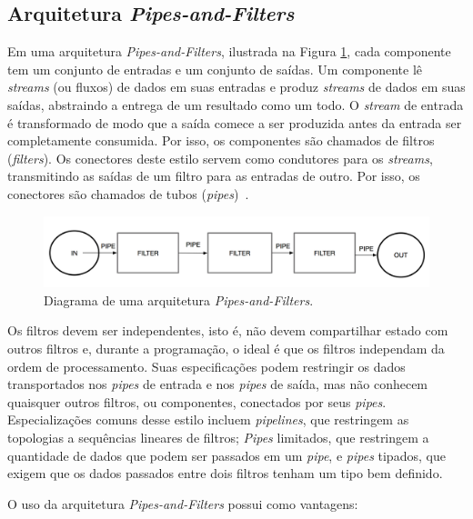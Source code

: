 \documentclass[portugues]{ic-tese}
\begin{document}
\subsection{Arquitetura \textit{Pipes-and-Filters}}

Em uma arquitetura \textit{Pipes-and-Filters}, ilustrada na Figura \ref{fig:PipeandFilter}, cada componente tem um conjunto de entradas e um conjunto de saídas. Um componente lê \textit{streams} (ou fluxos) de dados em suas entradas e produz \textit{streams} de dados em suas saídas, abstraindo a entrega de um resultado como um todo. O \textit{stream} de entrada é transformado de modo que a saída comece a ser produzida antes da entrada ser completamente consumida. Por isso, os componentes são chamados de filtros (\textit{filters}). Os conectores deste estilo servem como condutores para os \textit{streams}, transmitindo as saídas de um filtro para as entradas de outro. Por isso, os conectores são chamados de tubos (\textit{pipes})~\citep{Garlan_1993}.

\begin{figure}[h]
\centering
\includegraphics[scale=0.25]{images/PipeandFilter.png}
\caption {Diagrama de uma arquitetura \textit{Pipes-and-Filters}.}
\label{fig:PipeandFilter}
\end{figure}

Os filtros devem ser independentes, isto é, não devem compartilhar estado com outros filtros e, durante a programação, o ideal é que os filtros independam da ordem de processamento. Suas especificações podem restringir os dados transportados nos \textit{pipes} de entrada e nos \textit{pipes} de saída, mas não conhecem quaisquer outros filtros, ou componentes, conectados por seus \textit{pipes}. Especializações comuns desse estilo incluem \textit{pipelines}, que restringem as topologias a sequências lineares de filtros; \textit{Pipes} limitados, que restringem a quantidade de dados que podem ser passados em um \textit{pipe}, e \textit{pipes} tipados, que exigem que os dados passados entre dois filtros tenham um tipo bem definido.

O uso da arquitetura \textit{Pipes-and-Filters} possui como vantagens:
\end{document}
